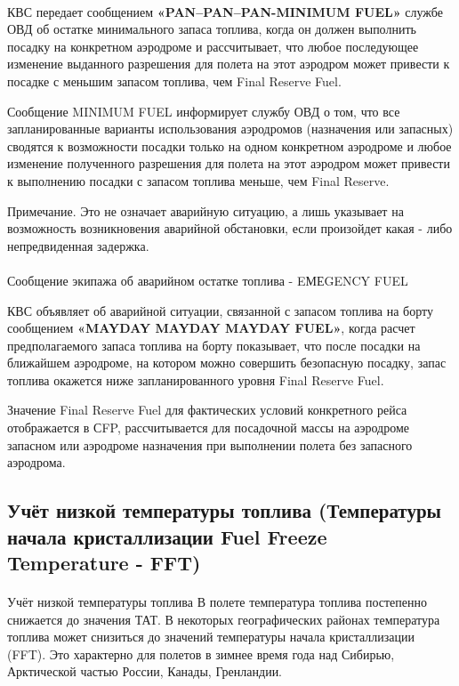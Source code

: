 \paragraph{} \label{par:1934}КВС передает сообщением \textbf{«PAN–PAN–PAN-MINIMUM FUEL»} службе ОВД об остатке минимального запаса топлива, когда он должен выполнить посадку на конкретном аэродроме и рассчитывает, что любое последующее изменение выданного разрешения для полета на этот аэродром может привести к посадке с меньшим запасом топлива, чем Final Reserve Fuel.

Сообщение MINIMUM FUEL информирует службу ОВД о том, что все запланированные варианты использования аэродромов (назначения или запасных) сводятся к возможности посадки только на одном конкретном аэродроме и любое изменение полученного разрешения для полета на этот аэродром может привести к выполнению посадки с запасом топлива меньше, чем Final Reserve.

Примечание. Это не означает аварийную ситуацию, а лишь указывает на возможность возникновения аварийной обстановки, если произойдет какая - либо непредвиденная задержка.

\paragraph{} Сообщение экипажа об аварийном остатке топлива - EМЕGENCY FUEL

КВС объявляет об аварийной ситуации, связанной с запасом топлива на борту сообщением \textbf{«MAYDAY MAYDAY MAYDAY FUEL»}, когда расчет предполагаемого запаса топлива на борту показывает, что после посадки на ближайшем аэродроме, на котором можно совершить безопасную посадку, запас топлива окажется ниже запланированного уровня Final Reserve Fuel.

Значение Final Reserve Fuel для фактических условий конкретного рейса отображается в СFP, рассчитывается для посадочной массы на аэродроме запасном или аэродроме назначения при выполнении полета без запасного аэродрома.

\subsection{Учёт низкой температуры топлива (Температуры начала кристаллизации Fuel Freeze Temperature - FFT)}

\paragraph{} Учёт низкой температуры топлива В полете температура топлива постепенно снижается до значения ТАТ. В некоторых географических районах температура топлива может снизиться до значений температуры начала кристаллизации (FFT). Это характерно для полетов в зимнее время года над Сибирью, Арктической частью России, Канады, Гренландии.

